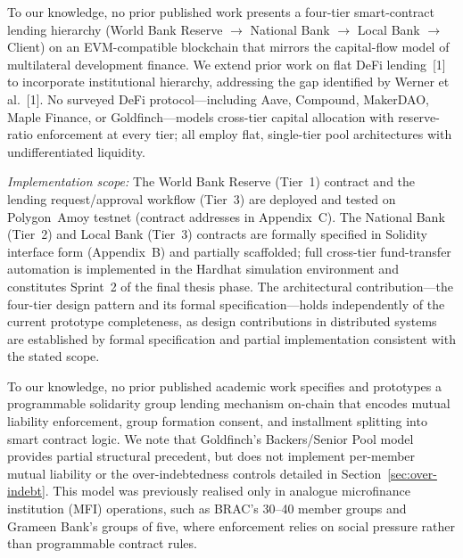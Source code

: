 \documentclass[12pt,a4paper]{report}
\begin{document}
\begin{description}[leftmargin=0pt]

\item[\textbf{Contribution 1 --- Four-Tier Hierarchical DeFi Architecture.}]
To our knowledge, no prior published work presents a four-tier smart-contract lending hierarchy (World Bank Reserve $\to$ National Bank $\to$ Local Bank $\to$ Client) on an EVM-compatible blockchain that mirrors the capital-flow model of multilateral development finance. We extend prior work on flat DeFi lending~[1] to incorporate institutional hierarchy, addressing the gap identified by Werner et al.~[1]. No surveyed DeFi protocol---including Aave, Compound, MakerDAO, Maple Finance, or Goldfinch---models cross-tier capital allocation with reserve-ratio enforcement at every tier; all employ flat, single-tier pool architectures with undifferentiated liquidity.

\textit{Implementation scope:} The World Bank Reserve (Tier~1) contract and the lending request/approval workflow (Tier~3) are deployed and tested on Polygon~Amoy testnet (contract addresses in Appendix~C). The National Bank (Tier~2) and Local Bank (Tier~3) contracts are formally specified in Solidity interface form (Appendix~B) and partially scaffolded; full cross-tier fund-transfer automation is implemented in the Hardhat simulation environment and constitutes Sprint~2 of the final thesis phase. The architectural contribution---the four-tier design pattern and its formal specification---holds independently of the current prototype completeness, as design contributions in distributed systems are established by formal specification and partial implementation consistent with the stated scope.

\item[\textbf{Contribution 2 --- On-Chain Solidarity Group Lending.}]
To our knowledge, no prior published academic work specifies and prototypes a programmable solidarity group lending mechanism on-chain that encodes mutual liability enforcement, group formation consent, and installment splitting into smart contract logic. We note that Goldfinch's Backers/Senior Pool model provides partial structural precedent, but does not implement per-member mutual liability or the over-indebtedness controls detailed in Section~\ref{sec:over-indebt}. This model was previously realised only in analogue microfinance institution (MFI) operations, such as BRAC's 30--40 member groups and Grameen Bank's groups of five, where enforcement relies on social pressure rather than programmable contract rules.


\end{description}
\end{document}
